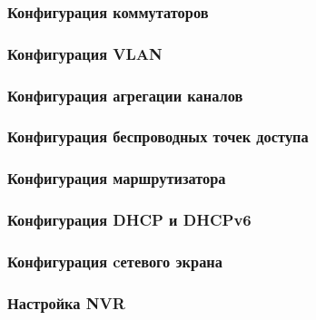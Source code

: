 \subsubsection{Конфигурация коммутаторов}
\subsubsection{Конфигурация VLAN}
\subsubsection{Конфигурация агрегации каналов}
\subsubsection{Конфигурация беспроводных точек доступа}
\subsubsection{Конфигурация маршрутизатора}
\subsubsection{Конфигурация DHCP и DHCPv6}
\subsubsection{Конфигурация cетевого экрана}
\subsubsection{Настройка NVR}